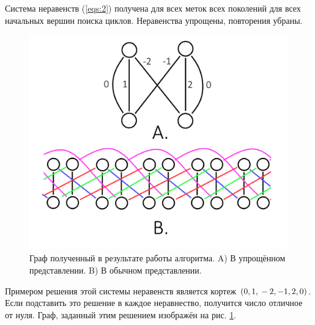 \documentclass[14pt]{mmcs-article}
\begin{document}
Система неравенств (\ref{eqs:2}) получена для всех меток всех поколений для всех начальных вершин поиска циклов. Неравенства упрощены, повторения убраны.

\begin{figure}[H]
  \centering
  \includegraphics[scale=0.4]{Fig_7.png}
  \caption{ Граф полученный в результате работы алгоритма. A) В упрощённом представлении. B) В обычном представлении. }
  \label{image:7}
\end{figure}

Примером решения этой системы неравенств является кортеж $(0, 1,\\ -2, -1, 2, 0)$. Если подставить это решение в каждое неравнество, получится число отличное от нуля. Граф, заданный этим решением изображён на рис. \ref{image:7}.
\end{document}
